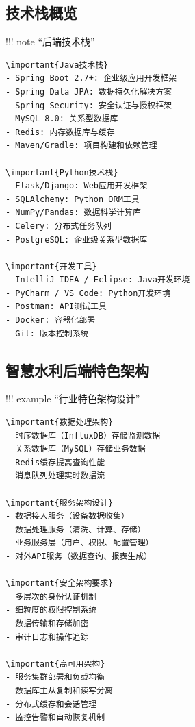 
\hypertarget{ux6280ux672fux6808ux6982ux89c8}{%
\subsection{技术栈概览}\label{ux6280ux672fux6808ux6982ux89c8}}

!!! note ``后端技术栈''

\begin{verbatim}
\important{Java技术栈}
- Spring Boot 2.7+: 企业级应用开发框架
- Spring Data JPA: 数据持久化解决方案
- Spring Security: 安全认证与授权框架
- MySQL 8.0: 关系型数据库
- Redis: 内存数据库与缓存
- Maven/Gradle: 项目构建和依赖管理

\important{Python技术栈}
- Flask/Django: Web应用开发框架
- SQLAlchemy: Python ORM工具
- NumPy/Pandas: 数据科学计算库
- Celery: 分布式任务队列
- PostgreSQL: 企业级关系型数据库

\important{开发工具}
- IntelliJ IDEA / Eclipse: Java开发环境
- PyCharm / VS Code: Python开发环境
- Postman: API测试工具
- Docker: 容器化部署
- Git: 版本控制系统
\end{verbatim}

\hypertarget{ux667aux6167ux6c34ux5229ux540eux7aefux7279ux8272ux67b6ux6784}{%
\subsection{智慧水利后端特色架构}\label{ux667aux6167ux6c34ux5229ux540eux7aefux7279ux8272ux67b6ux6784}}

!!! example ``行业特色架构设计''

\begin{verbatim}
\important{数据处理架构}
- 时序数据库（InfluxDB）存储监测数据
- 关系数据库（MySQL）存储业务数据
- Redis缓存提高查询性能
- 消息队列处理实时数据流

\important{服务架构设计}
- 数据接入服务（设备数据收集）
- 数据处理服务（清洗、计算、存储）
- 业务服务层（用户、权限、配置管理）
- 对外API服务（数据查询、报表生成）

\important{安全架构要求}
- 多层次的身份认证机制
- 细粒度的权限控制系统
- 数据传输和存储加密
- 审计日志和操作追踪

\important{高可用架构}
- 服务集群部署和负载均衡
- 数据库主从复制和读写分离
- 分布式缓存和会话管理
- 监控告警和自动恢复机制
\end{verbatim}

